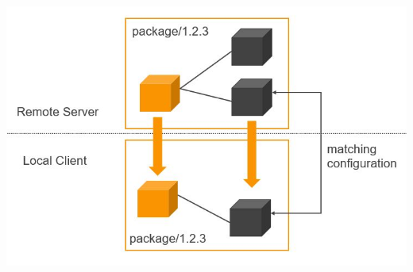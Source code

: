 \documentclass[10pt,a4paper]{article}
\begin{document}
\includegraphics[scale=0.2]{BinaryManagement_RemoteLocal}





\pagebreak
\end{document}
